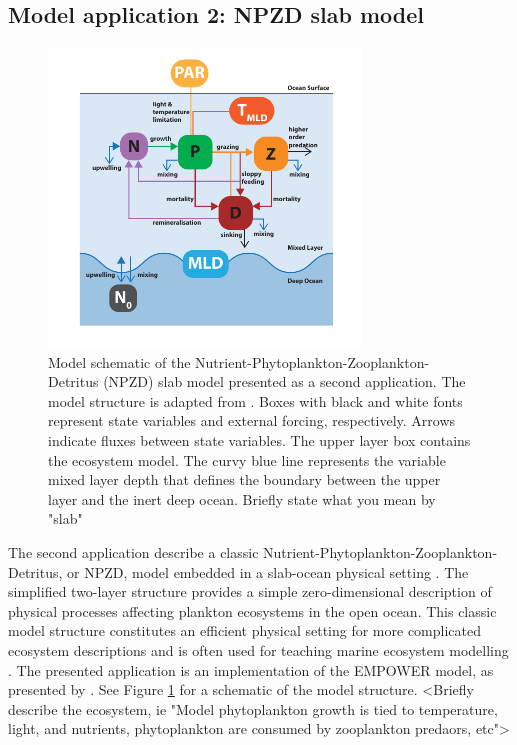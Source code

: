 \documentclass[journal abbreviation, manuscript]{copernicus}
\begin{document}
\subsection{Model application 2: NPZD slab model}
\begin{figure}[t]
\includegraphics[width=8.3cm]{Figures/firstdraft_schematics/02_schematics_EMPOWER.pdf}
\caption{Model schematic of the Nutrient-Phytoplankton-Zooplankton-Detritus (NPZD) slab model presented as a second application. The model structure is adapted
from \citet{Anderson2015c}. Boxes with black and white fonts represent state variables and external forcing, respectively. Arrows indicate fluxes between state variables. The upper layer box contains the ecosystem model. The curvy blue line represents the variable mixed layer depth that defines the boundary between the upper layer and the inert deep ocean. Briefly state what you mean by "slab"}
\label{Figure:ModelSchematics_2}
\end{figure}

The second application describe a classic Nutrient-Phytoplankton-Zooplankton-Detritus, or NPZD, model embedded in a slab-ocean physical setting \citep[e.g.,][]{Evans1985ACycles, Fasham1990a}. The simplified two-layer structure provides a simple zero-dimensional description of physical processes affecting plankton ecosystems in the open ocean. This classic model structure constitutes an efficient physical setting for more complicated ecosystem descriptions and is often used for teaching marine ecosystem modelling \citep{Anderson2015c}. The presented application is an implementation of the EMPOWER model, as presented by \citet{Anderson2015c}. See Figure \ref{Figure:ModelSchematics_2} for a schematic of the model structure. <Briefly describe the ecosystem, ie "Model phytoplankton growth is tied to temperature, light, and nutrients, phytoplankton are consumed by zooplankton predaors, etc">
\end{document}
